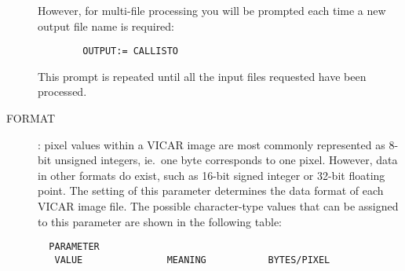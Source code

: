 \begin{description}
\begin{verbatim}
\end{verbatim}
However, for multi-file processing you will be prompted each time a new output
file name is required:
\begin{verbatim}
        OUTPUT:= CALLISTO
\end{verbatim}
This prompt is repeated until all the input files requested have been processed.
\item[FORMAT]:
pixel values within a VICAR image are most commonly represented as 8-bit
unsigned integers, ie.\ one byte corresponds to one pixel.
However, data in other formats do exist, such as 16-bit signed integer or 32-bit
floating point.
The setting of this parameter determines the data format of each VICAR image
file.
The possible character-type values that can be assigned to this parameter are
shown in the following table:
\begin{verbatim}
  PARAMETER
   VALUE               MEANING           BYTES/PIXEL


\end{verbatim}
\end{description}
